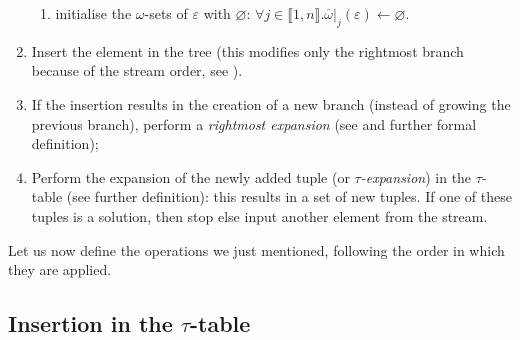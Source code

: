 \begin{enumerate}
\begin{enumerate}
    \item \label{algo:attr_insertion:3} initialise the \(\omega\)-sets
      of \(\varepsilon\) with \(\varnothing\): \(\forall j \in \llbracket 1, n
      \rrbracket.\overline{\omega}|_j(\varepsilon) \leftarrow \varnothing\).
  
  \end{enumerate}

  \item \label{algo:tree_insertion} Insert the element in the \XML
    tree (this modifies only the rightmost branch because of the
    stream order, see ).

  \item \label{algo:border_expansion} If the insertion results in the
    creation of a new branch (instead of growing the previous branch),
    perform a \emph{rightmost expansion} (see
     and further formal definition);

  \item \label{algo:tau_expansion} Perform the expansion of the
    newly added tuple (or \emph{\(\tau\)-expansion}) in the
    \(\tau\)-table (see further definition): this results in a set of
    new tuples. If one of these tuples is a solution, then stop else
    input another element from the stream.

\end{enumerate}

Let us now define the operations we just mentioned, following the
order in which they are applied.


\subsection{Insertion in the \(\tau\)-table}
\label{tau_insertion}

